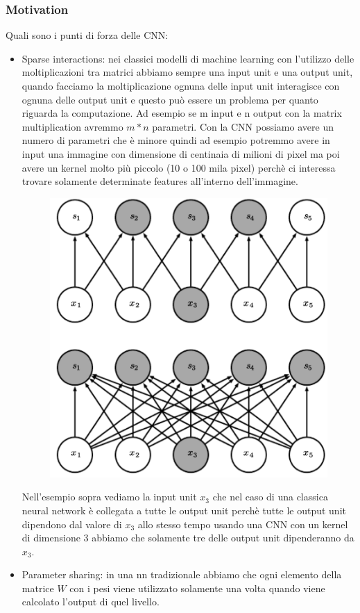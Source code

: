 \documentclass[14pt]{extreport}
\begin{document}
\subsubsection{Motivation}

Quali sono i punti di forza delle CNN:

\begin{itemize}
	\item Sparse interactions: nei classici modelli di machine learning con l'utilizzo delle moltiplicazioni tra matrici 
	abbiamo sempre una input unit e una output unit, quando facciamo la moltiplicazione ognuna delle input unit interagisce con ognuna delle 
	output unit e questo può essere un problema per quanto riguarda la computazione.
	Ad esempio se m input e n output con la matrix multiplication avremmo $m*n$ parametri. 
	Con la CNN possiamo avere un numero di parametri che è minore quindi ad esempio potremmo avere in input una immagine con dimensione di centinaia di milioni
	di pixel ma poi avere un kernel molto più piccolo (10 o 100 mila pixel) perchè ci interessa trovare solamente determinate features all'interno dell'immagine.
	\begin{figure}[H]
		\centering
		\includegraphics[width=0.7\linewidth]{411.jpeg}
		\end{figure}
	Nell'esempio sopra vediamo la input unit $x_3$ che nel caso di una classica neural network è collegata a tutte le output unit perchè
	tutte le output unit dipendono dal valore di $x_3$ allo stesso tempo usando una CNN con un kernel di dimensione 3 abbiamo che solamente tre delle output unit dipenderanno da $x_3$.
	\item Parameter sharing: in una nn tradizionale abbiamo che ogni elemento della matrice $W$ con i pesi viene utilizzato solamente una volta quando viene calcolato l'output di quel livello.

\end{itemize}
\end{document}
